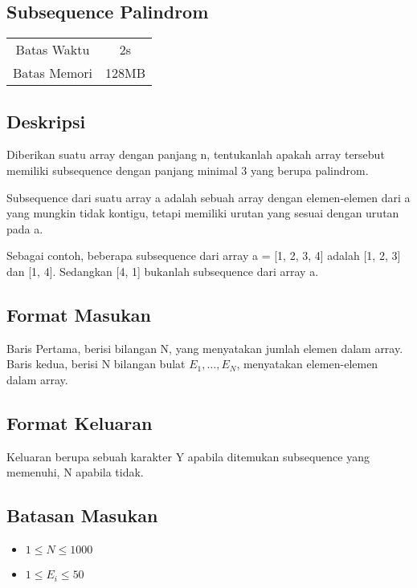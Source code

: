 \documentclass{article}
\begin{document}
\begin{center}
    \section*{Subsequence Palindrom} %

    \begin{tabular}{ | c c | }
        \hline
        Batas Waktu  & 2s \\    %
        Batas Memori & 128MB \\  %
        \hline
    \end{tabular}
\end{center}

\subsection*{Deskripsi}
Diberikan suatu array dengan panjang n, tentukanlah apakah array tersebut memiliki subsequence dengan panjang minimal 3 yang berupa palindrom.

Subsequence dari suatu array a adalah sebuah array dengan elemen-elemen dari a yang mungkin tidak kontigu, tetapi memiliki urutan yang sesuai dengan urutan pada a.

Sebagai contoh, beberapa subsequence dari array a = [1, 2, 3, 4] adalah [1, 2, 3] dan [1, 4]. Sedangkan [4, 1] bukanlah subsequence dari array a.



\subsection*{Format Masukan}
Baris Pertama, berisi bilangan N, yang menyatakan jumlah elemen dalam array.
Baris kedua, berisi N bilangan bulat $E_1, …, E_N$, menyatakan  elemen-elemen dalam array.


\subsection*{Format Keluaran}
Keluaran berupa sebuah karakter Y apabila ditemukan subsequence yang memenuhi, N apabila tidak.

\subsection*{Batasan Masukan}
\begin{itemize}
 \item $1 \leq  N  \leq 1000$
 \item $1 \leq  {E_i}  \leq 50$
\end{itemize}
\end{document}
